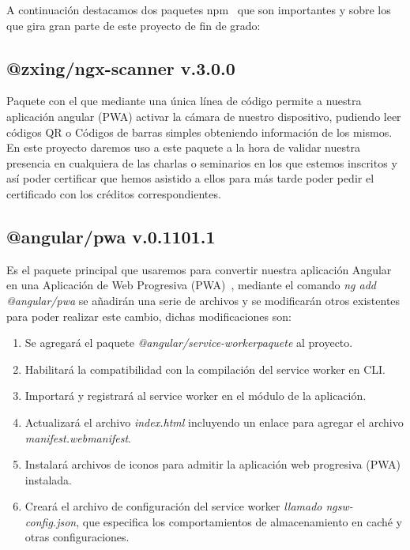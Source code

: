 \documentclass[a4paper, 12pt]{book}
\begin{document}
A continuación destacamos dos paquetes npm~\cite{NPM}  que son importantes y sobre los que gira gran parte de este proyecto de fin de grado:

\subsection{@zxing/ngx-scanner v.3.0.0}
\label{subsec:@zxing/ngx-scanner}
Paquete con el que mediante una única línea de código permite a nuestra aplicación angular (PWA) activar la cámara de nuestro dispositivo, pudiendo leer códigos QR o Códigos de barras simples obteniendo información de los mismos.
	En este proyecto daremos uso a este paquete a la hora de validar nuestra presencia en cualquiera de las charlas o seminarios en los que estemos inscritos y así poder certificar que hemos asistido a ellos para más tarde poder pedir el certificado con los créditos correspondientes.~\cite{ngx-scanner} 

\subsection{@angular/pwa v.0.1101.1}
\label{subsec:@angular/pwa}
Es el paquete principal que usaremos para convertir nuestra aplicación Angular en una Aplicación de Web Progresiva (PWA)~\cite{pwa}, mediante el comando \textit{ng add @angular/pwa} se añadirán una serie de archivos y se modificarán otros existentes para poder realizar este cambio, dichas modificaciones son:

\begin{enumerate}
\item Se agregará el paquete \textit{@angular/service-workerpaquete} al proyecto.

\item Habilitará la compatibilidad con la compilación del service worker en CLI.

\item Importará y registrará al service worker en el módulo de la aplicación.

\item Actualizará el archivo \textit{index.html} incluyendo un enlace para agregar el archivo \textit{manifest.webmanifest}.

\item Instalará archivos de iconos para admitir la aplicación web progresiva (PWA) instalada.

\item Creará el archivo de configuración del service worker \textit{llamado ngsw-config.json}, que especifica los comportamientos de almacenamiento en caché y otras configuraciones.
\end{enumerate}
\end{document}
